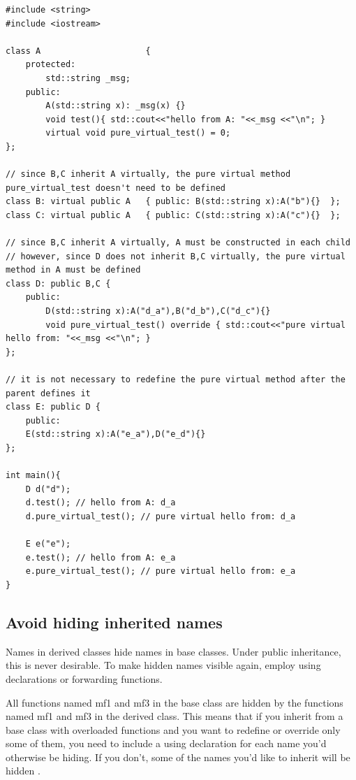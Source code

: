 \documentclass[a4paper,12pt,notitlepage]{article}
\begin{document}
\begin{verbatim}
#include <string>
#include <iostream>

class A                     { 
    protected: 
        std::string _msg; 
    public:
        A(std::string x): _msg(x) {} 
        void test(){ std::cout<<"hello from A: "<<_msg <<"\n"; } 
        virtual void pure_virtual_test() = 0;
}; 

// since B,C inherit A virtually, the pure virtual method pure_virtual_test doesn't need to be defined
class B: virtual public A   { public: B(std::string x):A("b"){}  }; 
class C: virtual public A   { public: C(std::string x):A("c"){}  }; 

// since B,C inherit A virtually, A must be constructed in each child
// however, since D does not inherit B,C virtually, the pure virtual method in A must be defined
class D: public B,C { 
    public: 
        D(std::string x):A("d_a"),B("d_b"),C("d_c"){}
        void pure_virtual_test() override { std::cout<<"pure virtual hello from: "<<_msg <<"\n"; }
}; 

// it is not necessary to redefine the pure virtual method after the parent defines it
class E: public D { 
    public: 
    E(std::string x):A("e_a"),D("e_d"){}  
};

int main(){
    D d("d");
    d.test(); // hello from A: d_a
    d.pure_virtual_test(); // pure virtual hello from: d_a

    E e("e"); 
    e.test(); // hello from A: e_a
    e.pure_virtual_test(); // pure virtual hello from: e_a
}
\end{verbatim}


\subsection{Avoid hiding inherited names}

Names in derived classes hide names in base classes. Under public
inheritance, this is never desirable. To make hidden names visible again, employ using declarations or
forwarding functions.

All functions named mf1 and mf3 in the base class are hidden by the functions named mf1 and mf3 in the derived class. This means that if you inherit from a base class with overloaded functions and you want to redefine or override only some of them, you need to include a using declaration for each name you'd otherwise be hiding. If you don't, some of the names you'd like to inherit will be hidden \cite{Meyers_eff}.
\end{document}
